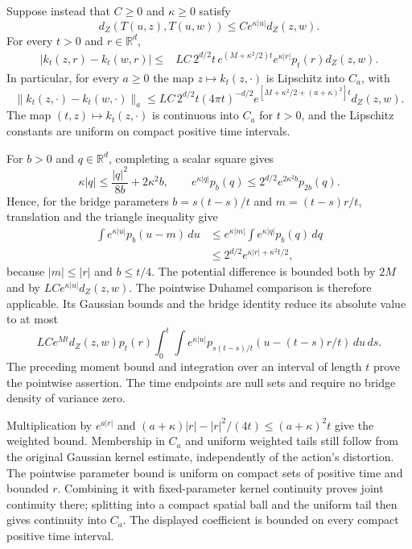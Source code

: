 \begin{theorem}
\label{thm:dynamic_exponential_action}
Suppose instead that $C\geq0$ and $\kappa\geq0$ satisfy
\[
d_Z(T(u,z),T(u,w))\leq C e^{\kappa|u|}d_Z(z,w).
\]
For every $t>0$ and $r\in\mathbb R^d$,
\[
\begin{split}
|k_t(z,r)-k_t(w,r)|
\leq{}&LC\,2^{d/2}t\,e^{(M+\kappa^2/2)t}
             e^{\kappa|r|}p_t(r)d_Z(z,w).
\end{split}
\]
In particular, for every $a\geq0$ the map $z\mapsto k_t(z,\cdot)$
is Lipschitz into $C_a$, with
\[
\|k_t(z,\cdot)-k_t(w,\cdot)\|_a
\leq LC\,2^{d/2}t(4\pi t)^{-d/2}
 e^{[M+\kappa^2/2+(a+\kappa)^2]t}d_Z(z,w).
\]
The map $(t,z)\mapsto k_t(z,\cdot)$ is continuous into $C_a$ for
$t>0$, and the Lipschitz constants are uniform on compact positive
time intervals.
\end{theorem}
\Proof
For $b>0$ and $q\in\mathbb R^d$, completing a scalar square gives
\[
\kappa|q|\leq\frac{|q|^2}{8b}+2\kappa^2b,
\qquad
e^{\kappa|q|}p_b(q)
\leq2^{d/2}e^{2\kappa^2b}p_{2b}(q).
\]
Hence, for the bridge parameters
$b=s(t-s)/t$ and $m=(t-s)r/t$, translation and the triangle
inequality give
\[
\begin{split}
\int e^{\kappa|u|}p_b(u-m)\,du
&\leq e^{\kappa|m|}\int e^{\kappa|q|}p_b(q)\,dq\\
&\leq2^{d/2}e^{\kappa|r|+\kappa^2t/2},
\end{split}
\]
because $|m|\leq|r|$ and $b\leq t/4$. The potential difference
is bounded both by $2M$ and by $LC e^{\kappa|u|}d_Z(z,w)$.
The pointwise Duhamel comparison is therefore applicable. Its
Gaussian bounds and the bridge identity reduce its absolute value to
at most
\[
LC e^{Mt}d_Z(z,w)p_t(r)
\int_0^t\int e^{\kappa|u|}p_{s(t-s)/t}(u-(t-s)r/t)\,du\,ds.
\]
The preceding moment bound and integration over an interval of length
$t$ prove the pointwise assertion. The time endpoints are null sets
and require no bridge density of variance zero.

Multiplication by $e^{a|r|}$ and
$(a+\kappa)|r|-|r|^2/(4t)\leq(a+\kappa)^2t$ give the
weighted bound. Membership in $C_a$ and uniform weighted tails still
follow from the original Gaussian kernel estimate, independently of
the action's distortion. The pointwise parameter bound is uniform on
compact sets of positive time and bounded $r$. Combining it with
fixed-parameter kernel continuity proves joint continuity there;
splitting into a compact spatial ball and the uniform tail then gives
continuity into $C_a$. The displayed coefficient is bounded on every
compact positive time interval.
\Done

